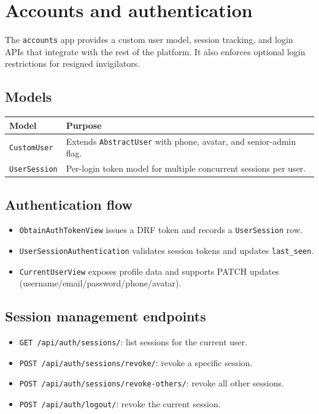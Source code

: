 \section{Accounts and authentication}
\label{sec:accounts}

The \texttt{accounts} app provides a custom user model, session tracking, and login APIs that integrate with the rest of the platform. It also enforces optional login restrictions for resigned invigilators.

\subsection{Models}
\label{subsec:accounts:models}

\begin{longtable}{p{}p{}}
\toprule
\textbf{Model} & \textbf{Purpose} \\
\midrule
\texttt{CustomUser} & Extends \texttt{AbstractUser} with phone, avatar, and senior-admin flag. \\
\texttt{UserSession} & Per-login token model for multiple concurrent sessions per user. \\
\bottomrule
\end{longtable}

\subsection{Authentication flow}
\label{subsec:accounts:authflow}

\begin{itemize}
  \item \texttt{ObtainAuthTokenView} issues a DRF token and records a \texttt{UserSession} row.
  \item \texttt{UserSessionAuthentication} validates session tokens and updates \texttt{last\_seen}.
  \item \texttt{CurrentUserView} exposes profile data and supports PATCH updates (username/email/password/phone/avatar).
\end{itemize}

\subsection{Session management endpoints}
\label{subsec:accounts:sessions}

\begin{itemize}
  \item \texttt{GET /api/auth/sessions/}: list sessions for the current user.
  \item \texttt{POST /api/auth/sessions/revoke/}: revoke a specific session.
  \item \texttt{POST /api/auth/sessions/revoke-others/}: revoke all other sessions.
  \item \texttt{POST /api/auth/logout/}: revoke the current session.
\end{itemize}

